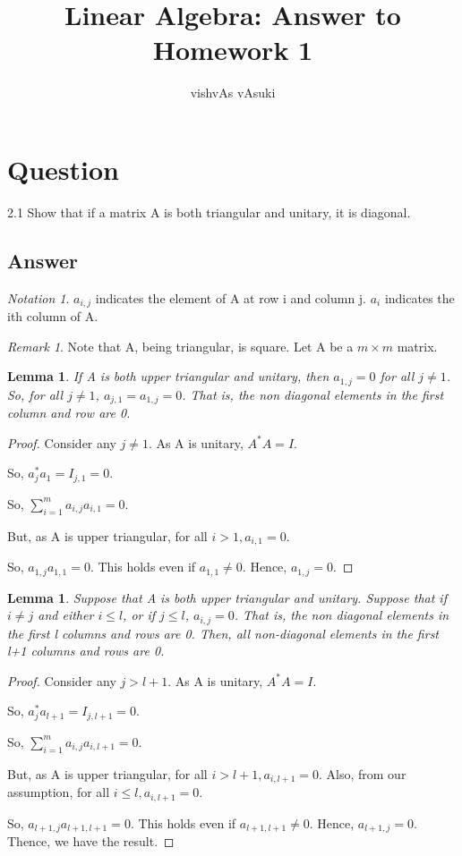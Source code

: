 \documentclass[10pt]{amsart}
\title{Linear Algebra: Answer to Homework 1}
\author{vishvAs vAsuki}
\newtheorem{lem}[thm]{Lemma}
\theoremstyle{remark}
\newtheorem*{notation}{Notation}
\newtheorem{rem}[thm]{Remark}
\begin{document}
\maketitle

\section{Question}
2.1 Show that if a matrix A is both triangular and unitary, it is diagonal.

\subsection{Answer}

\begin{notation}
$a_{i,j}$ indicates the element of A at row i and column j. $a_{i}$ indicates the ith column of A.
\end{notation}

\begin{rem}
Note that A, being triangular, is square. Let A be a $m \times m$ matrix.
\end{rem}

\begin{lem}
If A is both upper triangular and unitary, then $a_{1, j} = 0$ for all $j \neq 1$. So, for all $j \neq 1$, $a_{j, 1} = a_{1, j} = 0$. That is, the non diagonal elements in the first column and row are 0.
\end{lem}
\begin{proof}
Consider any $j \neq 1$. As A is unitary, $A^{*}A=I$.

So, $a_{j}^{*}a_{1} = I_{j,1} = 0$.

So, $\sum_{i=1}^{m} a_{i, j}a_{i, 1} = 0$.

But, as A is upper triangular, for all $i > 1, a_{i, 1} = 0$.

So, $a_{1, j}a_{1, 1} = 0$. This holds even if $a_{1, 1} \neq 0$. Hence, $a_{1, j}=0$.
\end{proof}

\begin{lem}
Suppose that A is both upper triangular and unitary. Suppose that if $i \neq j$ and either $i \leq l$, or if $j \leq l$, $a_{i,j} = 0$. That is, the non diagonal elements in the first l columns and rows are 0. Then, all non-diagonal elements in the first l+1 columns and rows are 0.
\end{lem}
\begin{proof}
Consider any $j > l+1$. As A is unitary, $A^{*}A=I$.

So, $a_{j}^{*}a_{l+1} = I_{j,l+1} = 0$.

So, $\sum_{i=1}^{m} a_{i, j}a_{i, l+1} = 0$.

But, as A is upper triangular, for all $i > l+1, a_{i, l+1} = 0$. Also, from our assumption, for all $i \leq l, a_{i, l+1} = 0$.

So, $a_{l+1, j}a_{l+1, l+1} = 0$. This holds even if $a_{l+1, l+1} \neq 0$. Hence, $a_{l+1, j}=0$. Thence, we have the result.
\end{proof}
\end{document}
